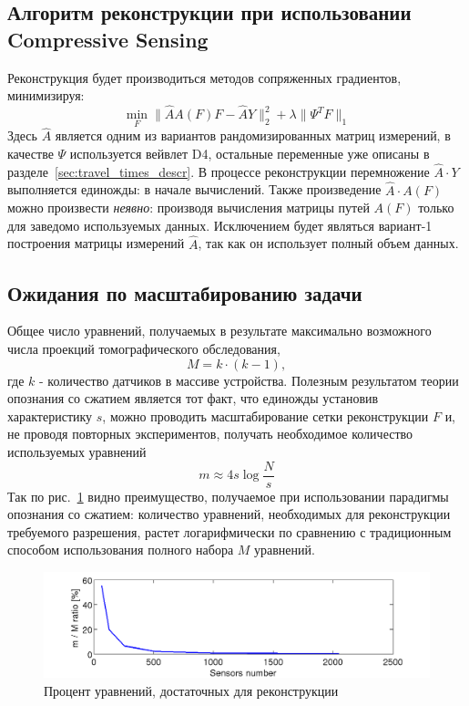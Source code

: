 \documentclass[14pt]{matmex-diploma}
\begin{document}
\subsection{Алгоритм реконструкции при использовании Compressive Sensing}
Реконструкция будет производиться методов сопряженных градиентов, минимизируя:
\begin{equation}
\label{eq:conj_cs}
\min_F \| \hat{A} A(F) F - \hat{A}Y \|_2^2 + \lambda \| \Psi^T F \|_1
\end{equation}
Здесь $\hat{A}$ является одним из вариантов рандомизированных матриц измерений, в качестве $\Psi$ используется вейвлет D4, остальные переменные уже описаны в разделе~\ref{sec:travel_times_descr}. В процессе реконструкции перемножение $\hat{A}\cdot Y$ выполняется единожды: в начале вычислений. Также произведение $\hat{A} \cdot A(F)$ можно произвести \textit{неявно}: производя вычисления матрицы путей $A(F)$ только для заведомо используемых данных. Исключением будет являться вариант-1 построения матрицы измерений $\hat{A}$, так как он использует полный объем данных.

\subsection{Ожидания по масштабированию задачи}
Общее число уравнений, получаемых в результате максимально возможного числа проекций томографического обследования, \[M = k\cdot (k-1),\] где $k$ - количество датчиков в массиве устройства. 
Полезным результатом теории опознания со сжатием является тот факт, что единожды установив характеристику $s$, можно проводить масштабирование сетки реконструкции $F$ и, не проводя повторных экспериментов, получать необходимое количество используемых уравнений
\begin{equation}\label{eq:approx_m}
m \approx 4 s  \log{\frac{N}{s}} 
\end{equation}
Так по рис.~\ref{fig:percents} видно преимущество, получаемое при использовании парадигмы опознания со сжатием: количество уравнений, необходимых для реконструкции требуемого разрешения, растет логарифмически по сравнению с традиционным способом использования полного набора $M$ уравнений.

\begin{figure}[h]
\centering
    \includegraphics[width=1\textwidth]{pics/percents.png}
    \caption{Процент уравнений, достаточных для реконструкции}
    \label{fig:percents}
\end{figure}
\end{document}
